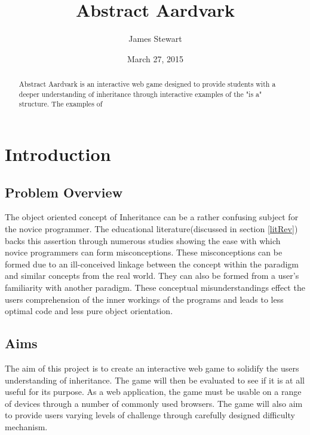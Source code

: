 \documentclass{l4proj}
\begin{document}
\title{Abstract Aardvark}
\author{James Stewart}
\date{March 27, 2015}
\maketitle

\begin{abstract}
Abstract Aardvark is an interactive web game designed to provide students with a deeper understanding of inheritance through interactive examples of the "is a" structure. The examples of 
\end{abstract}

\educationalconsent
%
%
\tableofcontents

\chapter{Introduction}
\section{Problem Overview}

The object oriented concept of Inheritance can be a rather confusing subject for the novice programmer. The educational literature(discussed in section \ref{litRev}) backs this assertion through numerous studies showing the ease with which novice programmers can form misconceptions. These misconceptions can be formed due to an ill-conceived linkage between the concept within the paradigm and similar concepts from the real world. They can also be formed from a user's familiarity with another paradigm. These conceptual misunderstandings effect the users comprehension of the inner workings of the programs and leads to less optimal code and less pure object orientation. 

\section{Aims}

The aim of this project is to create an interactive web game to solidify the users understanding of inheritance. The game will then be evaluated to see if it is at all useful for its purpose. As a web application, the game must be usable on a range of devices through a number of commonly used browsers. The game will also aim to provide users varying levels of challenge through carefully designed difficulty mechanism. 
\end{document}
